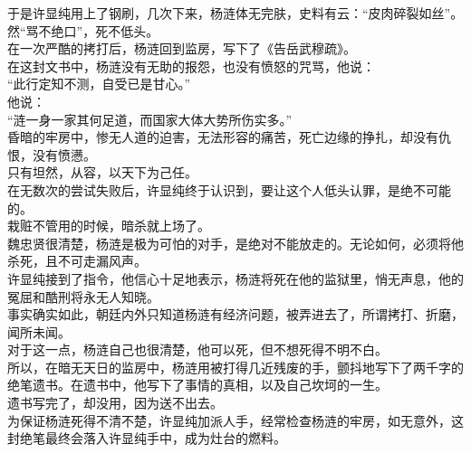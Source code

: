 \begin{multicols}{\theparacolNo}
于是许显纯用上了钢刷，几次下来，杨涟体无完肤，史料有云：“皮肉碎裂如丝”。\\

然“骂不绝口”，死不低头。\\

在一次严酷的拷打后，杨涟回到监房，写下了《告岳武穆疏》。\\

在这封文书中，杨涟没有无助的报怨，也没有愤怒的咒骂，他说：\\

“此行定知不测，自受已是甘心。”\\

他说：\\

“涟一身一家其何足道，而国家大体大势所伤实多。”\\

昏暗的牢房中，惨无人道的迫害，无法形容的痛苦，死亡边缘的挣扎，却没有仇恨，没有愤懑。\\

只有坦然，从容，以天下为己任。\\

在无数次的尝试失败后，许显纯终于认识到，要让这个人低头认罪，是绝不可能的。\\

栽赃不管用的时候，暗杀就上场了。\\

魏忠贤很清楚，杨涟是极为可怕的对手，是绝对不能放走的。无论如何，必须将他杀死，且不可走漏风声。\\

许显纯接到了指令，他信心十足地表示，杨涟将死在他的监狱里，悄无声息，他的冤屈和酷刑将永无人知晓。\\

事实确实如此，朝廷内外只知道杨涟有经济问题，被弄进去了，所谓拷打、折磨，闻所未闻。\\

对于这一点，杨涟自己也很清楚，他可以死，但不想死得不明不白。\\

所以，在暗无天日的监房中，杨涟用被打得几近残废的手，颤抖地写下了两千字的绝笔遗书。在遗书中，他写下了事情的真相，以及自己坎坷的一生。\\

遗书写完了，却没用，因为送不出去。\\

为保证杨涟死得不清不楚，许显纯加派人手，经常检查杨涟的牢房，如无意外，这封绝笔最终会落入许显纯手中，成为灶台的燃料。\\


\end{multicols}
